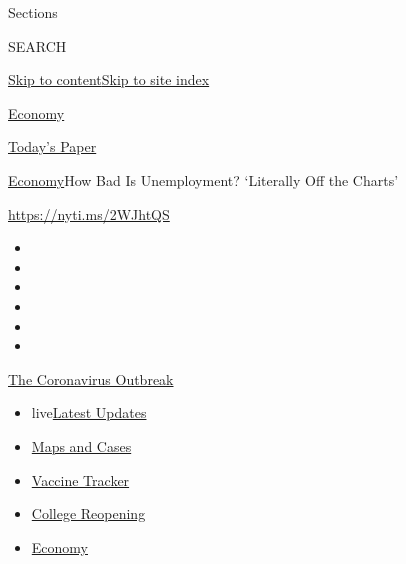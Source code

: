 Sections

SEARCH

\protect\hyperlink{site-content}{Skip to
content}\protect\hyperlink{site-index}{Skip to site index}

\href{https://www.nytimes.com/section/business/economy}{Economy}

\href{https://myaccount.nytimes.com/auth/login?response_type=cookie\&client_id=vi}{}

\href{https://www.nytimes.com/section/todayspaper}{Today's Paper}

\href{/section/business/economy}{Economy}\textbar{}How Bad Is
Unemployment? `Literally Off the Charts'

\url{https://nyti.ms/2WJhtQS}

\begin{itemize}
\item
\item
\item
\item
\item
\item
\end{itemize}

\href{https://www.nytimes.com/news-event/coronavirus?action=click\&pgtype=Article\&state=default\&region=TOP_BANNER\&context=storylines_menu}{The
Coronavirus Outbreak}

\begin{itemize}
\tightlist
\item
  live\href{https://www.nytimes.com/2020/08/04/world/coronavirus-cases.html?action=click\&pgtype=Article\&state=default\&region=TOP_BANNER\&context=storylines_menu}{Latest
  Updates}
\item
  \href{https://www.nytimes.com/interactive/2020/us/coronavirus-us-cases.html?action=click\&pgtype=Article\&state=default\&region=TOP_BANNER\&context=storylines_menu}{Maps
  and Cases}
\item
  \href{https://www.nytimes.com/interactive/2020/science/coronavirus-vaccine-tracker.html?action=click\&pgtype=Article\&state=default\&region=TOP_BANNER\&context=storylines_menu}{Vaccine
  Tracker}
\item
  \href{https://www.nytimes.com/2020/08/02/us/covid-college-reopening.html?action=click\&pgtype=Article\&state=default\&region=TOP_BANNER\&context=storylines_menu}{College
  Reopening}
\item
  \href{https://www.nytimes.com/live/2020/08/04/business/stock-market-today-coronavirus?action=click\&pgtype=Article\&state=default\&region=TOP_BANNER\&context=storylines_menu}{Economy}
\end{itemize}

